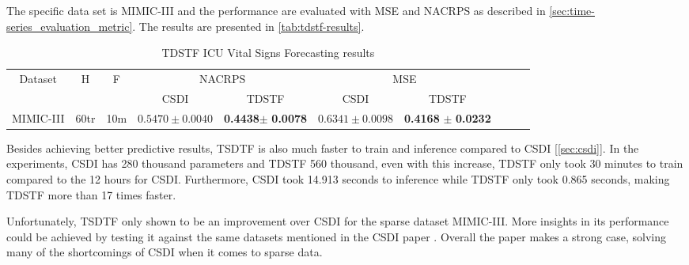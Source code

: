 The specific data set is MIMIC-III \cite{johnson_mimic-iii_2015} and the performance are evaluated with MSE and NACRPS as described in \autoref{sec:time-series_evaluation_metric}. The results are presented in \autoref{tab:tdstf-results}.

\begin{table}[ht]
    \centering
    \begin{tabular}{cccccccccc}
        \toprule
        \multirow{2}{*}{Dataset} & \multirow{2}{*}{H} & \multirow{2}{*}{F} & \multicolumn{2}{c}{NACRPS} & \multicolumn{2}{c}{MSE} \\
        \cmidrule(lr){4-5} \cmidrule(lr){6-7}
         & & & CSDI & TDSTF & CSDI & TDSTF \\
        \midrule
        \multirow{1}{*}{MIMIC-III} & 60tr  & 10m  & $0.5470 \pm 0.0040$ & \textbf{0.4438}$\pm$ \textbf{0.0078} & $0.6341 \pm 0.0098$ & \textbf{0.4168} $\pm$ \textbf{0.0232} \\
        \bottomrule
    \end{tabular}
    \caption{TDSTF ICU Vital Signs Forecasting results \cite{chang_tdstf_2023}}
    \label{tab:tdstf-results}
\end{table}

Besides achieving better predictive results, TSDTF is also much faster to train and inference compared to CSDI [\ref{sec:csdi}]. In the experiments, CSDI has 280 thousand parameters and TDSTF 560 thousand, even with this increase, TDSTF only took 30 minutes to train compared to the 12 hours for CSDI. Furthermore, CSDI took 14.913 seconds to inference while TDSTF only took 0.865 seconds, making TDSTF more than 17 times faster.

Unfortunately, TSDTF only shown to be an improvement over CSDI for the sparse dataset MIMIC-III. More insights in its performance could be achieved by testing it against the same datasets mentioned in the CSDI paper \cite{tashiro_csdi_2021}. Overall the paper makes a strong case, solving many of the shortcomings of CSDI when it comes to sparse data.